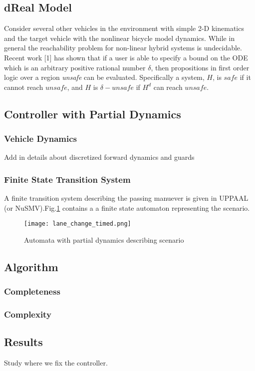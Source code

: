 \subsection{dReal Model}
Consider several other vehicles in the environment with simple 2-D kinematics and the target vehicle with the nonlinear bicycle model dynamics. While in general the reachability problem for non-linear hybrid systems is undecidable. Recent work [1] has shown that if a user is able to specify a bound on the ODE which is an arbitrary positive rational number \(\delta\), then propositions in first order logic over a region \textit{unsafe} can be evaluated. Specifically a system, \(H\), is \(safe\) if it cannot reach \(unsafe\), and \(H\) is \(\delta-unsafe\) if \(H^d\) can reach \(unsafe\). 

\subsection{Controller with Partial Dynamics}
\subsubsection{Vehicle Dynamics}
Add in details about discretized forward dynamics and guards
\subsubsection{Finite State Transition System}
A finite transition system describing the passing manuever is given in UPPAAL (or NuSMV).Fig.\ref{fig:automaton} contains a a finite state automaton representing the scenario.
\begin{figure}[tb]
	\label{fig:automaton}
	\centering
	\texttt{[image: lane\_change\_timed.png]}
	\caption{Automata with partial dynamics describing scenario}
\end{figure}
\subsection {Algorithm}
\subsubsection{Completeness}
\subsubsection{Complexity}
\subsection{Results}
Study where we fix the controller.